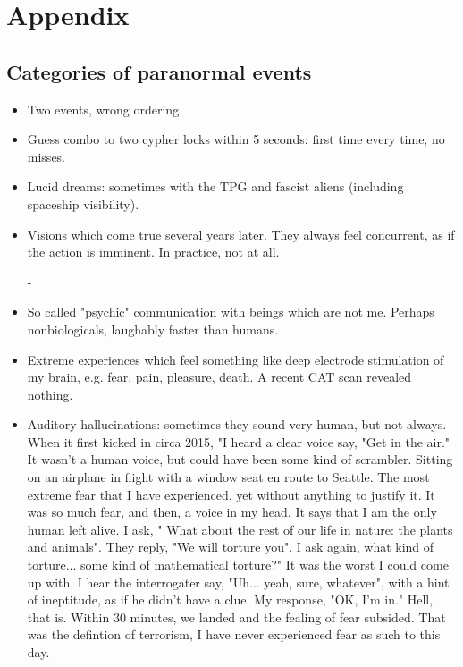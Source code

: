 \documentclass{article}
\begin{document}
\newpage \noindent
\section{Appendix}
\subsection{Categories of paranormal events}
\begin{itemize}

\item Two events, wrong ordering.

\item Guess combo to two cypher locks within 5 seconds: first time every time, no misses.

\item Lucid dreams: sometimes with the TPG and fascist aliens (including spaceship visibility).

\item Visions which come true several years later. They always feel concurrent, as if the action is imminent. In practice, not at all. 

-\item So called "psychic" communication with beings which are not me. Perhaps nonbiologicals, laughably faster than humans.

\item Extreme experiences which feel something like deep electrode stimulation of my brain, e.g. fear, pain, pleasure, death. A recent CAT scan revealed nothing.

\item Auditory hallucinations: sometimes they sound very human, but not always. When it first kicked in circa 2015, "I heard a clear voice say, "Get in the air." It wasn't a human voice, but could have been some kind of scrambler. Sitting on an airplane in flight with a window seat en route to Seattle. The most extreme fear that I have experienced, yet without anything to justify it. It was so much fear, and then, a voice in my head. It says that I am the only human left alive. I ask, " What about the rest of our life in nature: the plants and animals". They reply, "We will torture you". I ask again, what kind of torture... some kind of mathematical torture?" It was the worst I could come up with. I hear the interrogater say, "Uh... yeah, sure, whatever", with a hint of ineptitude, as if he didn't have a clue. My response, "OK, I'm in." Hell, that is. Within 30 minutes, we landed and the fealing of fear subsided. That was the defintion of terrorism, I have never experienced fear as such to this day.


\end{itemize}
\end{document}
